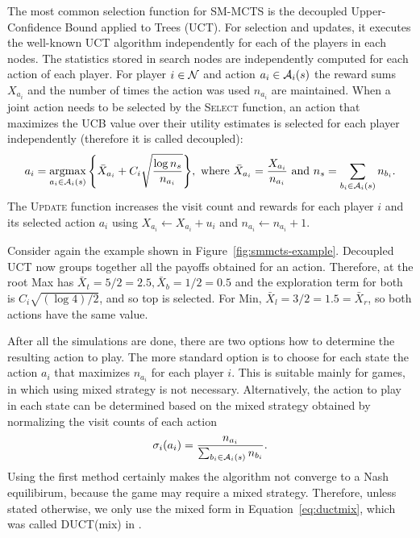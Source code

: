 The most common selection function for SM-MCTS is the decoupled Upper-Confidence Bound applied to Trees (UCT).
For selection and updates, it executes the well-known UCT \cite{UCT} algorithm independently for each of the players in each nodes.
The statistics stored in search nodes are independently computed for each action of each player. For player $i\in \mathcal{N}$ and
action $a_i \in \mathcal{A}_i(s)$ the reward sums $X_{a_i}$ and the number of times the action was used $n_{a_i}$ are maintained.
When a joint action needs to be selected by the \textsc{Select} function, an action that maximizes the UCB value over
their utility estimates is selected for each player independently (therefore it is called decoupled):
\begin{equation}
a_i = \argmax_{a_i \in \cA_i(s)}{ \left\{ \bar{X}_{a_i} + C_i \sqrt{\frac{\log n_s}{n_{a_i}}} \right\} },
  \mbox{ where } \bar{X}_{a_i} = \frac{X_{a_i}}{n_{a_i}} \mbox{ and } n_s=\sum_{b_i \in \cA_i(s)} n_{b_i}.\label{eq:uct}
\end{equation}
\noindent The \textsc{Update} function increases the visit count and rewards for each player $i$ and its selected action $a_i$ using $X_{a_i} \leftarrow X_{a_i} + u_i$
and $n_{a_i} \leftarrow n_{a_i} + 1$.

Consider again the example shown in Figure~\ref{fig:smmcts-example}. Decoupled UCT now groups together all the payoffs obtained
for an action. Therefore, at the root Max has $\bar{X}_t = 5/2 = 2.5, \bar{X}_b = 1/2 = 0.5$ and the exploration term for both is
$C_i \sqrt{(\log 4) / 2}$, and so top is selected. For Min, $\bar{X}_l = 3/2 = 1.5 = \bar{X}_r$, so both actions have the same value.

After all the simulations are done, there are two options how to determine the resulting action to play.
The more standard option is to choose for each state the action $a_i$ that maximizes $n_{a_i}$ for each player $i$.
This is suitable mainly for games, in which using mixed strategy is not necessary.
Alternatively, the action to play in each state can be determined based on the mixed strategy obtained by normalizing the visit counts of each action
\begin{equation}
\sigma_i(a_i) = \frac{n_{a_i}}{\sum_{b_i\in \mathcal{A}_i(s)} n_{b_i}}.
\label{eq:ductmix}
\end{equation}
Using the first method certainly makes the algorithm not converge to a Nash equilibirum, because the game may require a mixed strategy.
Therefore, unless stated otherwise, we only use the mixed form in Equation~\ref{eq:ductmix}, which was called DUCT(mix) in 
\cite{Lanctot13Goofspiel,Tak14smmcts}. %

